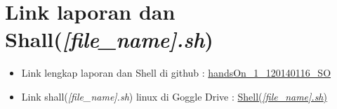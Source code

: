 \documentclass[11pt,a4paper]{article}
\begin{document}
\section{Link laporan dan Shall(\textit{[file\_name].sh})}
\begin{itemize}
	\item Link lengkap laporan dan Shell di github : \href{https://github.com/masQ-21dev/handsOn_1_120140116_SO.git}{handsOn\_1\_120140116\_SO}
	\item Link shall(\textit{[file\_name].sh}) linux di Goggle Drive : \href{https://drive.google.com/drive/folders/108PHgy26UJxgDnNY7fMCPOvoM_1Gnk_O?usp=sharing}{Shell(\textit{[file\_name].sh})}
\end{itemize}
\end{document}
